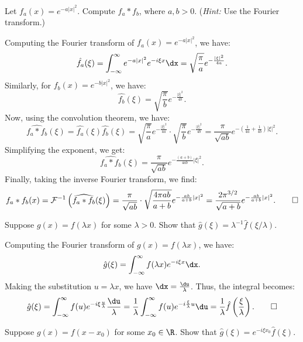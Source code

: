 \begin{problem}[5]
  Let $f_a(x) = e^{-a|x|^2}$. Compute $f_a * f_b$, where $a, b > 0$. (\textit{Hint:} Use the Fourier transform.)
\end{problem}

\begin{solution}
  Computing the Fourier transform of $f_a(x) = e^{-a|x|^2}$, we have:
  \[%
    \hat{f_a}(\xi) = \int_{-\infty}^{\infty} e^{-a|x|^2} e^{-i \xi x} \dx = \sqrt{\frac{\pi}{a}} e^{-\frac{|\xi|^2}{4a}}
  .\]%
  Similarly, for $f_b(x) = e^{-b|x|^2}$, we have:
  \[%
    \hat{f_b}(\xi) = \sqrt{\frac{\pi}{b}} e^{-\frac{|\xi|^2}{4b}}
  .\]%
  Now, using the convolution theorem, we have:
  \[%
    \widehat{f_a * f_b}(\xi) = \hat{f_a}(\xi) \hat{f_b}(\xi) = \sqrt{\frac{\pi}{a}} e^{-\frac{|\xi|^2}{4a}} \cdot \sqrt{\frac{\pi}{b}} e^{-\frac{|\xi|^2}{4b}} = \frac{\pi}{\sqrt{ab}} e^{-\left(\frac{1}{4a} + \frac{1}{4b}\right)|\xi|^2}
  .\]%
  Simplifying the exponent, we get:
  \[%
    \widehat{f_a * f_b}(\xi) = \frac{\pi}{\sqrt{ab}} e^{-\frac{(a+b)}{4ab}|\xi|^2}
  .\]%
  Finally, taking the inverse Fourier transform, we find:
  \[%
    f_a * f_b(x) = \F^{-1}\left(\widehat{f_a * f_b}(\xi)\right) = \frac{\pi}{\sqrt{ab}} \cdot \sqrt{\frac{4\pi ab}{a+b}} e^{-\frac{ab}{a+b}|x|^2} = \frac{2\pi^{3/2}}{\sqrt{a+b}} e^{-\frac{ab}{a+b}|x|^2}
  .\qedhere\]%
\end{solution}

\begin{problem}[6]
  Suppose $g(x) = f(\lambda x)$ for some $\lambda > 0$.  Show that $\hat g(\xi) = \lambda^{-1} \hat{f}(\xi/\lambda)$.
\end{problem}

\begin{solution}
  Computing the Fourier transform of $g(x) = f(\lambda x)$, we have:
  \[%
    \hat{g}(\xi) = \int_{-\infty}^{\infty} f(\lambda x) e^{-i \xi x} \dx
  .\]%
  Making the substitution $u = \lambda x$, we have $\dx = \frac{\du}{\lambda}$. Thus, the integral becomes:
  \[%
    \hat{g}(\xi) = \int_{-\infty}^{\infty} f(u) e^{-i \xi \frac{u}{\lambda}} \frac{\du}{\lambda} = \frac{1}{\lambda} \int_{-\infty}^{\infty} f(u) e^{-i \frac{\xi}{\lambda} u} \du = \frac{1}{\lambda} \hat{f}\left(\frac{\xi}{\lambda}\right)
  .\qedhere\]%
\end{solution}

\begin{problem}[7]
  Suppose $g(x) = f(x - x_0)$ for some $x_0 \in \R$. Show that $\hat{g}(\xi) = e^{-i\xi x_0} \hat{f}(\xi)$.
\end{problem}

